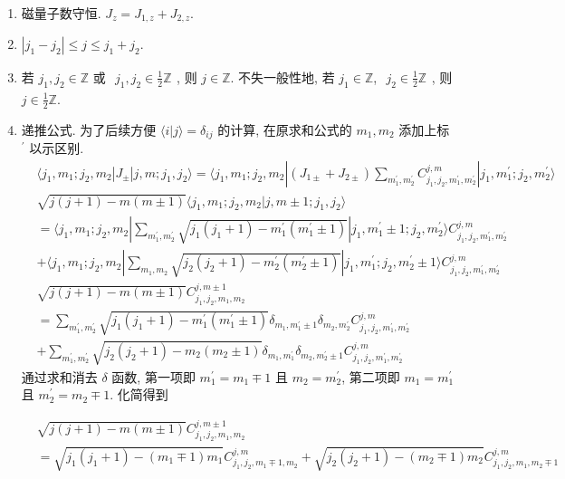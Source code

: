\documentclass[../../main.tex]{subfiles}
\begin{document}
\begin{enumerate}
    \item 磁量子数守恒. $J_{z} = J_{1,z} + J_{2,z}$.
    \item $|j_{1}-j_{2}|\leq j\leq j_{1} + j_{2}$.
    \item 若 $j_{1},j_{2}\in \mathbb{Z}$ 或 $\begin{aligned}
        j_{1},j_{2}\in\frac{1}{2}\mathbb{Z}
    \end{aligned}$, 则 $j\in\mathbb{Z}$. 不失一般性地, 若 $j_{1}\in\mathbb{Z}$, $\begin{aligned}
        j_{2}\in\frac{1}{2}\mathbb{Z}
    \end{aligned}$, 则 $j\in\frac{1}{2}\mathbb{Z}$.
    \item 递推公式. 为了后续方便 $\langle i|j\rangle = \delta_{ij}$ 的计算, 在原求和公式的 $m_{1},m_{2}$ 添加上标 $^{\prime}$ 以示区别.
    \begin{align*}
&\langle j_{1},m_{1};j_{2},m_{2}|J_{\pm}|j,m;j_{1},j_{2}\rangle = \langle j_{1},m_{1};j_{2},m_{2}|(J_{1\pm} + J_{2\pm})\sum_{m_{1}^{\prime},m_{2}^{\prime}}C_{j_{1},j_{2},m_{1}^{\prime},m_{2}^{\prime}}^{j,m}|j_{1},m_{1}^{\prime};j_{2},m_{2}^{\prime}\rangle\\
&\sqrt{j(j+1)-m(m\pm 1)}\langle j_{1},m_{1};j_{2},m_{2}|j,m\pm 1;j_{1},j_{2}\rangle\\
&= \langle j_{1},m_{1};j_{2},m_{2}|\sum_{m_{1}^{\prime},m_{2}^{\prime}}\sqrt{j_{1}(j_{1}+1)-m_{1}^{\prime}(m_{1}^{\prime}\pm 1)}|j_{1},m_{1}^{\prime}\pm 1;j_{2},m_{2}^{\prime}\rangle C_{j_{1},j_{2},m_{1}^{\prime},m_{2}^{\prime}}^{j,m}\\
&+\langle j_{1},m_{1};j_{2},m_{2}|\sum_{m_{1},m_{2}}\sqrt{j_{2}(j_{2}+1) - m_{2}^{\prime}(m_{2}^{\prime}\pm 1)}|j_{1},m_{1}^{\prime};j_{2},m_{2}^{\prime}\pm 1\rangle C_{j_{1},j_{2},m_{1}^{\prime},m_{2}^{\prime}}^{j,m}\\
&\sqrt{j(j+1)-m(m\pm 1)}C_{j_{1},j_{2},m_{1},m_{2}}^{j,m\pm 1}\\
&= \sum_{m_{1}^{\prime},m_{2}^{\prime}}\sqrt{j_{1}(j_{1}+1)-m_{1}^{\prime}(m_{1}^{\prime}\pm 1)}\delta_{m_{1},m_{1}^{\prime}\pm 1}\delta_{m_{2},m_{2}^{\prime}}C_{j_{1},j_{2},m_{1}^{\prime},m_{2}^{\prime}}^{j,m}\\
&+ \sum_{m_{1}^{\prime},m_{2}^{\prime}}\sqrt{j_{2}(j_{2}+1)-m_{2}(m_{2}\pm 1)}\delta_{m_{1},m_{1}^{\prime}}\delta_{m_{2},m_{2}^{\prime}\pm 1}C_{j_{1},j_{2},m_{1}^{\prime},m_{2}^{\prime}}^{j,m}
    \end{align*}
通过求和消去 $\delta$ 函数, 第一项即 $m_{1}^{\prime} = m_{1}\mp 1$ 且 $m_{2}=m_{2}^{\prime}$, 第二项即 $m_{1} = m_{1}^{\prime}$ 且 $m_{2}^{\prime} = m_{2}\mp 1$. 化简得到

\begin{align*}
    &\sqrt{j(j+1)-m(m\pm 1)}C_{j_{1},j_{2},m_{1},m_{2}}^{j,m\pm 1} \\
    &= \sqrt{j_{1}(j_{1}+1)-(m_{1}\mp 1)m_{1}}C_{j_{1},j_{2},m_{1}\mp 1,m_{2}}^{j,m} + \sqrt{j_{2}(j_{2}+1)-(m_{2}\mp 1)m_{2}}C_{j_{1},j_{2},m_{1},m_{2}\mp 1}^{j,m}
\end{align*}
\end{enumerate}
\end{document}
